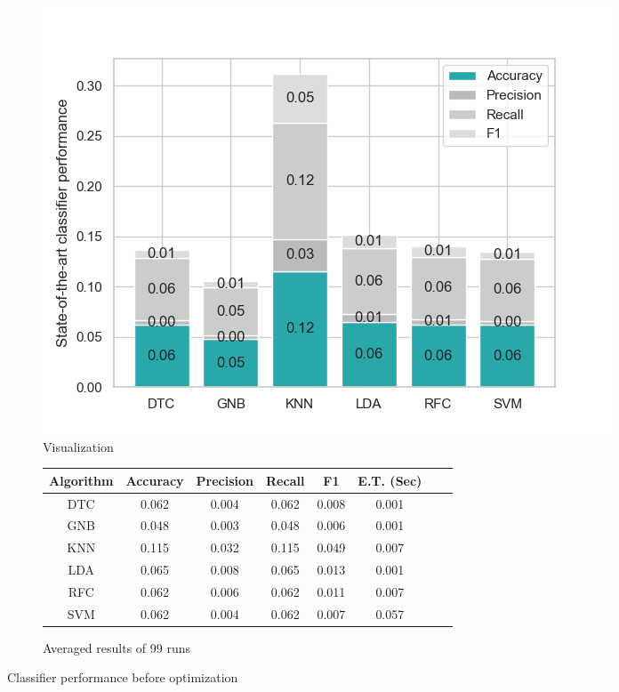 	\begin{figure}[H]
		\centering
		\begin{subfigure}{0.45\textwidth}
			\centering
			\includegraphics[width=\textwidth]{Plots/Performance_before.png}
			\caption{Visualization}
			\label{fig:performance_before_plot}
		\end{subfigure}%
		\begin{subfigure}{0.55\textwidth}
			\centering
			\small
			\begin{tabular}{|c|c|c|c|c|c|c|c|}
				\hline
					\textbf{Algorithm} &\textbf{Accuracy} &\textbf{Precision} &\textbf{Recall} &\textbf{F1} &\textbf{E.T. (Sec)} \\ \hline
					\hline
					DTC    & 0.062   & 0.004   & 0.062  & 0.008   & 0.001 \\ \hline
					GNB    & 0.048   & 0.003   & 0.048  & 0.006   & 0.001 \\ \hline
					KNN    & 0.115   & 0.032   & 0.115  & 0.049   & 0.007 \\ \hline
					LDA    & 0.065   & 0.008   & 0.065  & 0.013   & 0.001 \\ \hline
					RFC    & 0.062   & 0.006   & 0.062  & 0.011   & 0.007 \\ \hline
					SVM    & 0.062   & 0.004   & 0.062  & 0.007   & 0.057 \\				
				\hline
			\end{tabular}
			\caption{Averaged results of 99 runs}
			\label{tab:performance_before}
		\end{subfigure}
		\caption{Classifier performance before optimization}
	\end{figure}